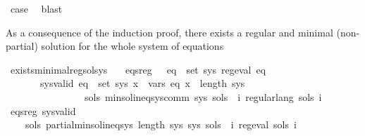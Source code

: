\begin{isabellebody}
\ {\isacharquery}{\kern0pt}case\ \isamarkupfalse%
\ blast\isanewline
{}\isamarkupfalse%
%
\endisatagproof
{\isafoldproof}%
%
\isadelimproof
%
\endisadelimproof
%
\begin{isamarkuptext}%
As a consequence of the induction proof, there exists a regular and minimal (non-partial)
solution for the whole system of equations%
\end{isamarkuptext}\isamarkuptrue%
\isamarkupfalse%
\ exists{\isacharunderscore}{\kern0pt}minimal{\isacharunderscore}{\kern0pt}reg{\isacharunderscore}{\kern0pt}sol{\isacharunderscore}{\kern0pt}sys{\isacharcolon}{\kern0pt}\isanewline
\ \ \ eqs{\isacharunderscore}{\kern0pt}reg{\isacharcolon}{\kern0pt}\ \ \ {\isachardoublequoteopen}{\isasymforall}eq\ {\isasymin}\ set\ sys{\isachardot}{\kern0pt}\ reg{\isacharunderscore}{\kern0pt}eval\ eq{\isachardoublequoteclose}\isanewline
\ \ \ \ \ \ \ sys{\isacharunderscore}{\kern0pt}valid{\isacharcolon}{\kern0pt}\ {\isachardoublequoteopen}{\isasymforall}eq\ {\isasymin}\ set\ sys{\isachardot}{\kern0pt}\ {\isasymforall}x\ {\isasymin}\ vars\ eq{\isachardot}{\kern0pt}\ x\ {\isacharless}{\kern0pt}\ length\ sys{\isachardoublequoteclose}\isanewline
\ \ \ \ \ \ \ \ \ \ \ \ \ \ \ \ {\isachardoublequoteopen}{\isasymexists}sols{\isachardot}{\kern0pt}\ min{\isacharunderscore}{\kern0pt}sol{\isacharunderscore}{\kern0pt}ineq{\isacharunderscore}{\kern0pt}sys{\isacharunderscore}{\kern0pt}comm\ sys\ sols\ {\isasymand}\ {\isacharparenleft}{\kern0pt}{\isasymforall}i{\isachardot}{\kern0pt}\ regular{\isacharunderscore}{\kern0pt}lang\ {\isacharparenleft}{\kern0pt}sols\ i{\isacharparenright}{\kern0pt}{\isacharparenright}{\kern0pt}{\isachardoublequoteclose}\isanewline
%
\isadelimproof
%
\endisadelimproof
%
\isatagproof
{}\isamarkupfalse%
\ {\isacharminus}{\kern0pt}\isanewline
\ \ \isamarkupfalse%
\ eqs{\isacharunderscore}{\kern0pt}reg\ sys{\isacharunderscore}{\kern0pt}valid\ \isamarkupfalse%
\isanewline
\ \ \ \ {\isachardoublequoteopen}{\isasymexists}sols{\isachardot}{\kern0pt}\ partial{\isacharunderscore}{\kern0pt}min{\isacharunderscore}{\kern0pt}sol{\isacharunderscore}{\kern0pt}ineq{\isacharunderscore}{\kern0pt}sys\ {\isacharparenleft}{\kern0pt}length\ sys{\isacharparenright}{\kern0pt}\ sys\ sols\ {\isasymand}\ {\isacharparenleft}{\kern0pt}{\isasymforall}i{\isachardot}{\kern0pt}\ reg{\isacharunderscore}{\kern0pt}eval\ {\isacharparenleft}{\kern0pt}sols\ i{\isacharparenright}{\kern0pt}{\isacharparenright}{\kern0pt}{\isachardoublequoteclose}\isanewline

\end{isabellebody}
